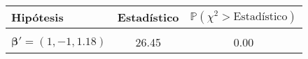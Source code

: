 \documentclass[border=3mm,preview]{standalone}
\numberwithin{equation}{section}
\begin{document}
\centering
\begin{varwidth}{\linewidth}
\begin{tabular}{@{}lcc@{}}
\toprule 
Hipótesis & Estadístico & $\mathbb{P}(\chi^{2}>\text{Estadístico})$\\ 
\midrule \\ 
$\boldsymbol{\beta}' = (1,-1,\text{1.18})$ & 26.45 &  0.00 \\
\bottomrule
\end{tabular}
\end{varwidth}
\end{document}
